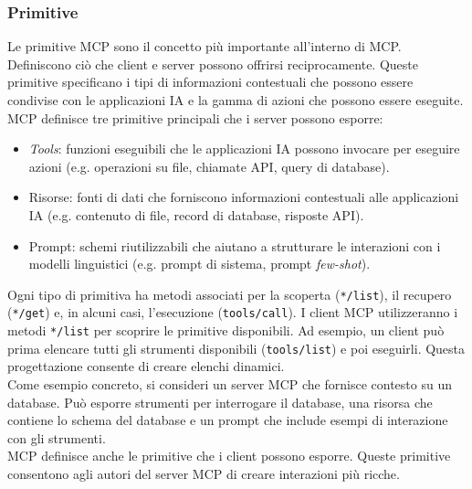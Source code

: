 \subsubsection{Primitive}
Le primitive MCP sono il concetto più importante all'interno di MCP. Definiscono ciò che client e server possono offrirsi reciprocamente. Queste primitive specificano i tipi di informazioni contestuali che possono essere condivise con le applicazioni IA e la gamma di azioni che possono essere eseguite.
MCP definisce tre primitive principali che i server possono esporre:
\begin{itemize}
\item \textit{Tools}: funzioni eseguibili che le applicazioni IA possono invocare per eseguire azioni (e.g. operazioni su file, chiamate API, query di database).
\item Risorse: fonti di dati che forniscono informazioni contestuali alle applicazioni IA (e.g. contenuto di file, record di database, risposte API).
\item Prompt: schemi riutilizzabili che aiutano a strutturare le interazioni con i modelli linguistici (e.g. prompt di sistema, prompt \textit{few-shot}).
\end{itemize}
Ogni tipo di primitiva ha metodi associati per la scoperta (\texttt{*/list}), il recupero (\texttt{*/get}) e, in alcuni casi, l'esecuzione (\texttt{tools/call}). I client MCP utilizzeranno i metodi \texttt{*/list} per scoprire le primitive disponibili. Ad esempio, un client può prima elencare tutti gli strumenti disponibili (\texttt{tools/list}) e poi eseguirli. Questa progettazione consente di creare elenchi dinamici. \\
Come esempio concreto, si consideri un server MCP che fornisce contesto su un database. Può esporre strumenti per interrogare il database, una risorsa che contiene lo schema del database e un prompt che include esempi di interazione con gli strumenti. \\
MCP definisce anche le primitive che i client possono esporre. Queste primitive consentono agli autori del server MCP di creare interazioni più ricche.
